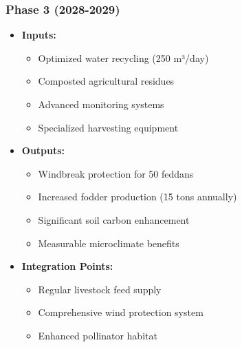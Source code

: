 \subsubsection{Phase 3 (2028-2029)}
\begin{itemize}
    \item \textbf{Inputs:}
    \begin{itemize}
        \item Optimized water recycling (250 m³/day)
        \item Composted agricultural residues
        \item Advanced monitoring systems
        \item Specialized harvesting equipment
    \end{itemize}
    \item \textbf{Outputs:}
    \begin{itemize}
        \item Windbreak protection for 50 feddans
        \item Increased fodder production (15 tons annually)
        \item Significant soil carbon enhancement
        \item Measurable microclimate benefits
    \end{itemize}
    \item \textbf{Integration Points:}
    \begin{itemize}
        \item Regular livestock feed supply
        \item Comprehensive wind protection system
        \item Enhanced pollinator habitat
    \end{itemize}
\end{itemize}


